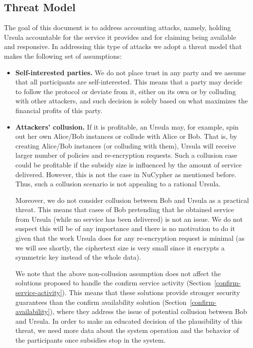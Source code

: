 \subsection{Threat Model}
The goal of this document is to address accounting attacks, namely, holding Ursula accountable for the service it provides and for claiming being available and responsive. In addressing this type of attacks we adopt a threat model that makes the following set of assumptions:
\begin{itemize}
\setlength{\itemsep}{5pt}
\item {\bf Self-interested parties.} We do not place trust in any party and we assume that all participants are 
self-interested. This means that a party may decide to follow the protocol or deviate from it, either on its own or by colluding with other attackers, and such decision is solely based on what maximizes the financial profits
of this party.

\item {\bf Attackers' collusion.} If it is profitable, an Ursula may, for example, spin out her own Alice/Bob instances or collude with Alice or Bob. That is, by creating Alice/Bob instances (or colluding with them), Ursula will receive larger number of policies and re-encryption requests. Such a collusion case could be profitable if the subsidy size is influenced by the amount of service delivered. However, this is not the case in NuCypher as mentioned before. Thus, such a collusion scenario is not appealing to a rational Ursula. 


Moreover, we do not consider collusion between Bob and Ursula as a practical threat. This means that cases of Bob pretending that he obtained service from Ursula (while no service has been delivered) is not an issue. We do not suspect this will be of any importance and there is no motivation to do it given that the work Ursula does for any re-encryption request is minimal (as we will see shortly, the ciphertext size is very small since it encrypts a symmetric key instead of the whole data).


We note that the above non-collusion assumption does not affect the solutions proposed to handle the confirm service activity  (Section~\ref{confirm-service-activity}). This means that these solutions provide stronger security guarantees than the confirm availability solution (Section~\ref{confirm-availability}), where they address the issue of potential collusion between Bob and Ursula. In order to make an educated decision of the plausibility of this threat, we need more data about the system operation and the behavior of the participants once subsidies stop in the system. 



\end{itemize}

